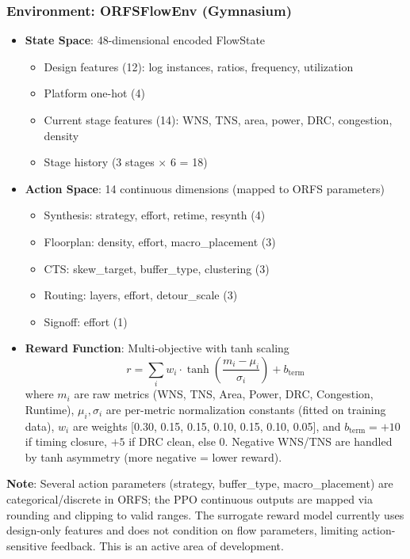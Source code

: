 \documentclass[10pt,conference]{IEEEtran}
\begin{document}
\subsubsection{Environment: ORFSFlowEnv (Gymnasium)}

\setlength{\itemsep}{2pt}
\setlength{\parskip}{0pt}
\begin{itemize}
    \item \textbf{State Space}: 48-dimensional encoded FlowState
    \begin{itemize}
        \item Design features (12): log instances, ratios, frequency, utilization
        \item Platform one-hot (4)
        \item Current stage features (14): WNS, TNS, area, power, DRC, congestion, density
        \item Stage history (3 stages $\times$ 6 = 18)
    \end{itemize}
    \item \textbf{Action Space}: 14 continuous dimensions (mapped to ORFS parameters)
    \begin{itemize}
        \item Synthesis: strategy, effort, retime, resynth (4)
        \item Floorplan: density, effort, macro\_placement (3)
        \item CTS: skew\_target, buffer\_type, clustering (3)
        \item Routing: layers, effort, detour\_scale (3)
        \item Signoff: effort (1)
    \end{itemize}
    \item \textbf{Reward Function}: Multi-objective with tanh scaling
    \begin{equation}
    r = \sum_{i} w_i \cdot \tanh\left(\frac{m_i - \mu_i}{\sigma_i}\right) + b_{\text{term}}
    \end{equation}
    where $m_i$ are raw metrics (WNS, TNS, Area, Power, DRC, Congestion, Runtime), $\mu_i, \sigma_i$ are per-metric normalization constants (fitted on training data), $w_i$ are weights [0.30, 0.15, 0.15, 0.10, 0.15, 0.10, 0.05], and $b_{\text{term}} = +10$ if timing closure, $+5$ if DRC clean, else $0$. Negative WNS/TNS are handled by tanh asymmetry (more negative = lower reward).
\end{itemize}

\textbf{Note}: Several action parameters (strategy, buffer\_type, macro\_placement) are categorical/discrete in ORFS; the PPO continuous outputs are mapped via rounding and clipping to valid ranges. The surrogate reward model currently uses design-only features and does not condition on flow parameters, limiting action-sensitive feedback. This is an active area of development.
\end{document}
